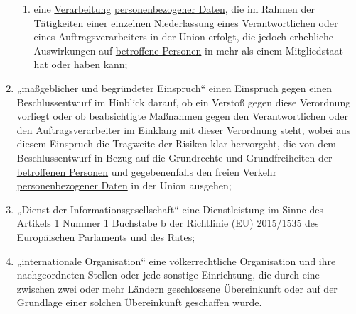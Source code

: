 \begin{enumerate}
\begin{enumerate}
    \item eine \hyperref[itm:04-2]{Verarbeitung} \hyperref[itm:04-1]{personenbezogener Daten}, die im Rahmen der Tätigkeiten einer einzelnen Niederlassung eines
     Verantwortlichen oder eines Auftragsverarbeiters in der Union erfolgt, die jedoch erhebliche Auswirkungen auf
     \hyperref[itm:04-1]{betroffene Personen} in mehr als einem Mitgliedstaat hat oder haben kann;
    \label{itm:04-23b}

  \end{enumerate}

  \item „maßgeblicher und begründeter Einspruch“ einen Einspruch gegen einen Beschlussentwurf im Hinblick darauf, ob ein
   Verstoß gegen diese Verordnung vorliegt oder ob beabsichtigte Maßnahmen gegen den Verantwortlichen oder den
   Auftragsverarbeiter im Einklang mit dieser Verordnung steht, wobei aus diesem Einspruch die Tragweite der Risiken
   klar hervorgeht, die von dem Beschlussentwurf in Bezug auf die Grundrechte und Grundfreiheiten der \hyperref[itm:04-1]{betroffenen
   Personen} und gegebenenfalls den freien Verkehr \hyperref[itm:04-1]{personenbezogener Daten} in der Union ausgehen;
  \label{itm:04-27}
 
  \item „Dienst der Informationsgesellschaft“ eine Dienstleistung im Sinne des Artikels 1 Nummer 1 Buchstabe b der
   Richtlinie (EU) 2015/1535 des Europäischen Parlaments und des Rates;
  \label{itm:04-28}

  \item „internationale Organisation“ eine völkerrechtliche Organisation und ihre nachgeordneten Stellen oder jede
   sonstige Einrichtung, die durch eine zwischen zwei oder mehr Ländern geschlossene Übereinkunft oder auf der
   Grundlage einer solchen Übereinkunft geschaffen wurde.
  \label{itm:04-29}

\end{enumerate}


